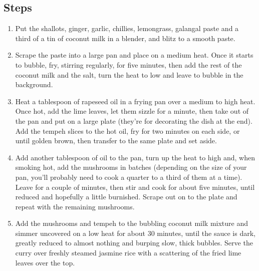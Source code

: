\documentclass{book}
\begin{document}
\subsection*{Steps}
\begin{enumerate}
\item Put the shallots, ginger, garlic, chillies, lemongrass, galangal paste and a third of a tin of coconut milk in a blender, and blitz to a smooth paste.
\item Scrape the paste into a large pan and place on a medium heat. Once it starts to bubble, fry, stirring regularly, for five minutes, then add the rest of the coconut milk and the salt, turn the heat to low and leave to bubble in the background.
\item Heat a tablespoon of rapeseed oil in a frying pan over a medium to high heat. Once hot, add the lime leaves, let them sizzle for a minute, then take out of the pan and put on a large plate (they’re for decorating the dish at the end). Add the tempeh slices to the hot oil, fry for two minutes on each side, or until golden brown, then transfer to the same plate and set aside.
\item Add another tablespoon of oil to the pan, turn up the heat to high and, when smoking hot, add the mushrooms in batches (depending on the size of your pan, you’ll probably need to cook a quarter to a third of them at a time). Leave for a couple of minutes, then stir and cook for about five minutes, until reduced and hopefully a little burnished. Scrape out on to the plate and repeat with the remaining mushrooms.
\item Add the mushrooms and tempeh to the bubbling coconut milk mixture and simmer uncovered on a low heat for about 30 minutes, until the sauce is dark, greatly reduced to almost nothing and burping slow, thick bubbles. Serve the curry over freshly steamed jasmine rice with a scattering of the fried lime leaves over the top.
\end{enumerate}
\newpage
\end{document}
